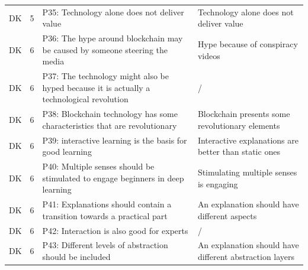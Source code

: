 \begin{table}[H]
\begin{tabularx}{\textwidth}{ll|X|p{4.5cm}}
	DK & 5 & P35: Technology alone does not deliver value & Technology alone does not deliver value  \\
	DK & 6 & P36: The hype around blockchain may be caused by someone steering the media & Hype because of conspiracy videos  \\
	DK & 6 & P37: The technology might also be hyped because it is actually a technological revolution & /  \\
	DK & 6 & P38: Blockchain technology has some characteristics that are revolutionary & Blockchain presents some revolutionary elements  \\
	DK & 6 & P39: interactive learning is the basis for good learning & Interactive explanations are better than static ones \\
	DK & 6 & P40: Multiple senses should be stimulated to engage beginners in deep learning & Stimulating multiple senses is engaging  \\
	DK & 6 & P41: Explanations should contain a transition towards a practical part & An explanation should have different aspects  \\
	DK & 6 & P42: Interaction is also good for experts & /  \\
	DK & 6 & P43: Different levels of abstraction should be included & An explanation should have different abstraction layers  \\
    \end{tabularx}
\end{table}

